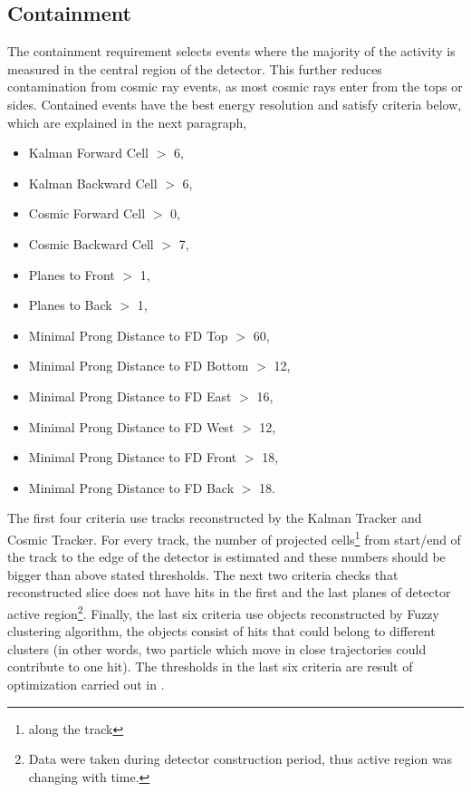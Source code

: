 \subsection{Containment} \label{Containment}
The containment requirement selects events where the majority of the activity is
measured in the central region of the detector. This further reduces contamination from cosmic 
ray events, as most cosmic rays enter from the tops or sides.  Contained events have the best 
energy resolution and satisfy criteria below, which are explained in the next paragraph,

\begin{itemize}
\item Kalman Forward Cell $>$ 6,
\item Kalman Backward Cell $>$ 6,
\item Cosmic Forward Cell $>$ 0,
\item Cosmic Backward Cell $>$ 7,
\item Planes to Front $>$ 1,
\item Planes to Back $>$ 1,
\item Minimal Prong Distance to FD Top $>$ 60,
\item Minimal Prong Distance to FD Bottom $>$ 12,
\item Minimal Prong Distance to FD East $>$ 16,
\item Minimal Prong Distance to FD West $>$ 12,
\item Minimal Prong Distance to FD Front $>$ 18,
\item Minimal Prong Distance to FD Back $>$ 18.
\end{itemize}
The first four criteria use tracks reconstructed by the Kalman Tracker and Cosmic Tracker.
For every track, the number of projected cells\footnote{along the track} from start/end of the track 
to the edge of the detector is estimated and these numbers should be bigger than above stated
thresholds. The next two criteria checks that reconstructed slice does not have hits in the first
and the last planes of detector active region\footnote{Data were taken during detector construction
period, thus active region was changing with time.}. Finally, the last six criteria use objects
reconstructed by Fuzzy clustering algorithm, the objects consist of hits that could belong to 
different clusters (in other words, two particle which move in close trajectories could contribute
to one hit). The thresholds in the last six criteria are result of optimization carried out in 
\cite{numucont_technote}.

